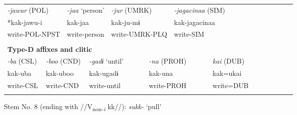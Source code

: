 \begin{tabularx}{\textwidth}{XXXXXXm{}XXXXXXXXXXXXXXXX}
\multicolumn{4}{X}{{ \textit{{}-jawur} (POL)}} & \multicolumn{2}{X}{{ \textit{{}-jaa} ‘person’}} & \multicolumn{5}{X}{{ \textit{{}-jur} (UMRK)}} & \multicolumn{3}{X}{{ \textit{{}-jagacinaa} (SIM)}} & \multicolumn{9}{X}{}\\
\multicolumn{4}{X}{{ *kak-jawu-i}} & \multicolumn{2}{X}{kak-jaa} & \multicolumn{5}{X}{kak-ju-mɨ} & \multicolumn{3}{X}{{ kak-jagacinaa}} & \multicolumn{9}{X}{}\\
\multicolumn{4}{X}{write-POL-NPST} & \multicolumn{2}{X}{write-person} & \multicolumn{5}{X}{write-UMRK-PLQ} & \multicolumn{3}{X}{write-SIM} & \multicolumn{9}{X}{}\\
\multicolumn{23}{X}{}\\
\multicolumn{23}{X}{{\bfseries Type-D affixes and clitic}}\\
{ \textit{{}-ba} (CSL)} & \multicolumn{4}{X}{{ \textit{{}-boo} (CND)}} & \multicolumn{4}{X}{{ \textit{{}-gadɨ} ‘until’}} & \multicolumn{4}{X}{{ \textit{{}-na} (PROH)}} & \multicolumn{4}{X}{{ \textit{kai} (DUB)}} & \multicolumn{6}{X}{}\\
{ kak-uba} & \multicolumn{4}{X}{{ kak-uboo}} & \multicolumn{4}{X}{{ kak-ugadɨ}} & \multicolumn{4}{X}{{ kak-una}} & \multicolumn{4}{X}{{ kak=ukai}} & \multicolumn{6}{X}{}\\
write-CSL & \multicolumn{4}{X}{write-CND} & \multicolumn{4}{X}{write-until} & \multicolumn{4}{X}{write-PROH} & \multicolumn{4}{X}{write=DUB} & \multicolumn{6}{X}{}\\
\lspbottomrule
\end{tabularx}
Stem No. 8 (ending with //V\textsubscript{non-}\textit{\textsubscript{i} }kk//): \textit{sukk-} ‘pull’

\tablefirsthead{}

